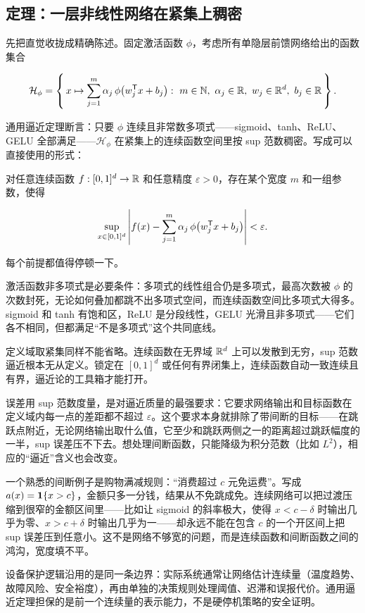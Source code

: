 \subsection{定理：一层非线性网络在紧集上稠密}

先把直觉收拢成精确陈述。固定激活函数 \(\phi\)，考虑所有单隐层前馈网络给出的函数集合

\[
\mathcal H_\phi
=\left\{\,x\mapsto\sum_{j=1}^{m}\alpha_j\,
\phi\bigl(w_j^{\mathsf{T}} x+b_j\bigr)
:\ m\in\mathbb{N},\ \alpha_j\in\mathbb{R},\ w_j\in\mathbb{R}^d,\ b_j\in\mathbb{R}\,\right\}.
\]

通用逼近定理断言：只要 \(\phi\) 连续且非常数多项式——sigmoid、tanh、ReLU、GELU 全部满足——\(\mathcal H_\phi\) 在紧集上的连续函数空间里按 sup 范数稠密。写成可以直接使用的形式：

对任意连续函数 \(f:[0,1]^d\to\mathbb{R}\) 和任意精度 \(\varepsilon>0\)，存在某个宽度 \(m\) 和一组参数，使得

\[
\sup_{x\in[0,1]^d}
\left|f(x)-\sum_{j=1}^{m}\alpha_j\,
\phi\bigl(w_j^{\mathsf{T}} x+b_j\bigr)\right|
<\varepsilon.
\]

每个前提都值得停顿一下。

激活函数非多项式是必要条件：多项式的线性组合仍是多项式，最高次数被 \(\phi\) 的次数封死，无论如何叠加都跳不出多项式空间，而连续函数空间比多项式大得多。sigmoid 和 tanh 有饱和区，ReLU 是分段线性，GELU 光滑且非多项式——它们各不相同，但都满足``不是多项式''这个共同底线。

定义域取紧集同样不能省略。连续函数在无界域 \(\mathbb{R}^d\) 上可以发散到无穷，sup 范数逼近根本无从定义。锁定在 \([0,1]^d\) 或任何有界闭集上，连续函数自动一致连续且有界，逼近论的工具箱才能打开。

误差用 sup 范数度量，是对逼近质量的最强要求：它要求网络输出和目标函数在定义域内每一点的差距都不超过 \(\varepsilon\)。这个要求本身就排除了带间断的目标——在跳跃点附近，无论网络输出取什么值，它至少和跳跃两侧之一的距离超过跳跃幅度的一半，sup 误差压不下去。想处理间断函数，只能降级为积分范数（比如 \(L^2\)），相应的``逼近''含义也会改变。

一个熟悉的间断例子是购物满减规则：``消费超过 \(c\) 元免运费''。写成 \(a(x)=\mathbf{1}\{x>c\}\)，金额只多一分钱，结果从不免跳成免。连续网络可以把过渡压缩到很窄的金额区间里——比如让 sigmoid 的斜率极大，使得 \(x<c-\delta\) 时输出几乎为零、\(x>c+\delta\) 时输出几乎为一——却永远不能在包含 \(c\) 的一个开区间上把 sup 误差压到任意小。这不是网络不够宽的问题，而是连续函数和间断函数之间的鸿沟，宽度填不平。

设备保护逻辑沿用的是同一条边界：实际系统通常让网络估计连续量（温度趋势、故障风险、安全裕度），再由单独的决策规则处理阈值、迟滞和误报代价。通用逼近定理担保的是前一个连续量的表示能力，不是硬停机策略的安全证明。

